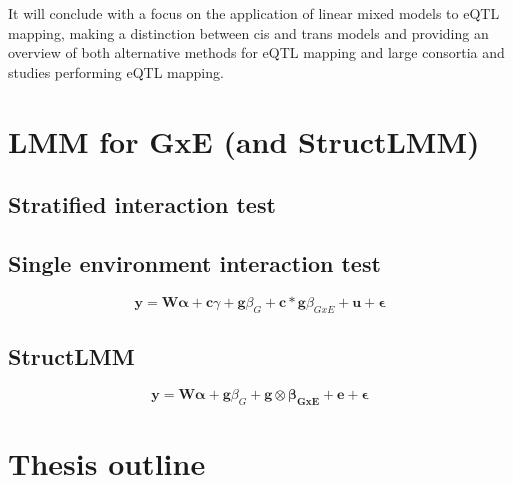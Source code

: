 It will conclude with a focus on the application of linear mixed models to eQTL mapping, making a distinction between cis and trans models and providing an overview of both alternative methods for eQTL mapping and large consortia and studies performing eQTL mapping.


\section{LMM for GxE (and StructLMM)}

\subsection{Stratified interaction test}
\subsection{Single environment interaction test}

\begin{equation}\label{eq22:Interaction_test_FE_LMM}
 \mathbf{y} =  \mathbf{W}\boldsymbol{\alpha} + \mathbf{c}\gamma  + \mathbf{g}\beta_G + \mathbf{c}*\mathbf{g}\beta_{GxE} + \mathbf{u} + \boldsymbol{\epsilon} 
\end{equation}

\subsection{StructLMM}

\begin{equation}\label{eq23:StructLMM-int}
 \mathbf{y} =  \mathbf{W}\boldsymbol{\alpha} + \mathbf{g}\beta_G + \mathbf{g} \otimes \boldsymbol{\beta_{GxE}} + \mathbf{e} + \boldsymbol{\epsilon} 
\end{equation}

\section{Thesis outline}